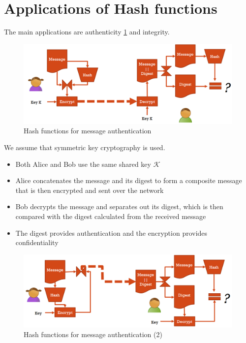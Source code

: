\section{Applications of Hash functions}

The main applications are authenticity \ref{fig:hashauthentication} and integrity.

\begin{figure}
	\centering
	\includegraphics[width=0.7\linewidth]{Images/Chapter6/hash_authentication}
	\caption{Hash functions for message authentication}
	\label{fig:hashauthentication}
\end{figure}

We assume that symmetric key cryptography is used.
\begin{itemize}
	\item Both Alice and Bob use the same shared key $\mathcal{K}$
	\item Alice concatenates the message and its digest to form a composite message that is then encrypted and sent over the network
	\item Bob decrypts the message and separates out its digest, which is then compared with the digest calculated from the received message
	\item The digest provides authentication and the encryption provides confidentiality
\end{itemize}

\begin{figure}
	\centering
	\includegraphics[width=0.7\linewidth]{Images/Chapter6/hash_authentication2}
	\caption{Hash functions for message authentication (2)}
	\label{fig:hashauthentication2}
\end{figure}


